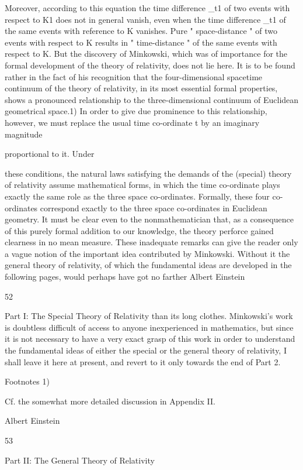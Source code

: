 \documentclass{article}
\begin{document}
Moreover, according to this equation the time difference \_t1 of two events with respect to
K1 does not in general vanish, even when the time difference \_t1 of the same events with
reference to K vanishes. Pure " space-distance " of two events with respect to K results in "
time-distance " of the same events with respect to K. But the discovery of Minkowski,
which was of importance for the formal development of the theory of relativity, does not lie
here. It is to be found rather in the fact of his recognition that the four-dimensional spacetime continuum of the theory of relativity, in its most essential formal properties, shows a
pronounced relationship to the three-dimensional continuum of Euclidean geometrical
space.1) In order to give due prominence to this relationship, however, we must replace the
usual time co-ordinate t by an imaginary magnitude

proportional to it. Under

these conditions, the natural laws satisfying the demands of the (special) theory of relativity
assume mathematical forms, in which the time co-ordinate plays exactly the same role as
the three space co-ordinates. Formally, these four co-ordinates correspond exactly to the
three space co-ordinates in Euclidean geometry. It must be clear even to the nonmathematician that, as a consequence of this purely formal addition to our knowledge, the
theory perforce gained clearness in no mean measure.
These inadequate remarks can give the reader only a vague notion of the important idea
contributed by Minkowski. Without it the general theory of relativity, of which the
fundamental ideas are developed in the following pages, would perhaps have got no farther
Albert Einstein

52

Part I: The Special Theory of Relativity
than its long clothes. Minkowski's work is doubtless difficult of access to anyone
inexperienced in mathematics, but since it is not necessary to have a very exact grasp of this
work in order to understand the fundamental ideas of either the special or the general theory
of relativity, I shall leave it here at present, and revert to it only towards the end of Part 2.

Footnotes
1)

Cf. the somewhat more detailed discussion in Appendix II.

Albert Einstein

53

Part II: The General Theory of Relativity
\end{document}
